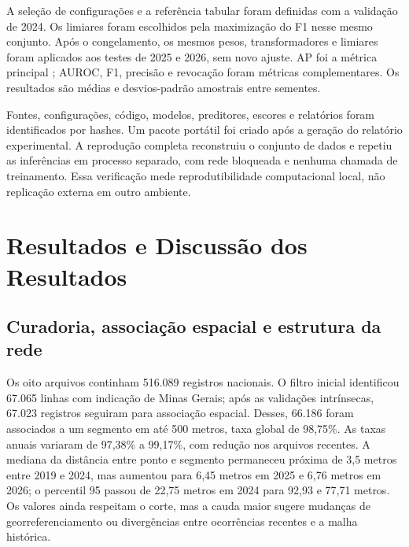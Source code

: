 \documentclass[12pt]{article}
\begin{document}
A seleção de configurações e a referência tabular foram definidas com
a validação de 2024. Os limiares foram escolhidos pela maximização do
F1 nesse mesmo conjunto. Após o congelamento, os mesmos pesos,
transformadores e limiares foram aplicados aos testes de 2025 e 2026,
sem novo ajuste. AP foi a métrica principal \cite{saito2015}; AUROC, F1,
precisão e revocação foram métricas complementares. Os resultados são
médias e desvios-padrão amostrais entre sementes.

Fontes, configurações, código, modelos, preditores, escores e relatórios
foram identificados por hashes. Um pacote portátil foi criado após a
geração do relatório experimental. A reprodução completa reconstruiu o
conjunto de dados e repetiu as inferências em processo separado, com
rede bloqueada e nenhuma chamada de treinamento. Essa verificação mede
reprodutibilidade computacional local, não replicação externa em outro
ambiente.

\clearpage

\section{Resultados e Discussão dos Resultados}
\label{sec:resultados}

\subsection{Curadoria, associação espacial e estrutura da rede}

Os oito arquivos continham 516.089 registros nacionais. O filtro
inicial identificou 67.065 linhas com indicação de Minas Gerais; após
as validações intrínsecas, 67.023 registros seguiram para associação
espacial. Desses, 66.186 foram associados a um segmento em até 500
metros, taxa global de 98,75\%. As taxas anuais variaram de 97,38\% a
99,17\%, com redução nos arquivos recentes. A mediana da distância
entre ponto e segmento permaneceu próxima de 3,5 metros entre 2019 e
2024, mas aumentou para 6,45 metros em 2025 e 6,76 metros em 2026; o
percentil 95 passou de 22,75 metros em 2024 para 92,93 e 77,71 metros.
Os valores ainda respeitam o corte, mas a cauda maior sugere mudanças
de georreferenciamento ou divergências entre ocorrências recentes e a
malha histórica.
\end{document}
